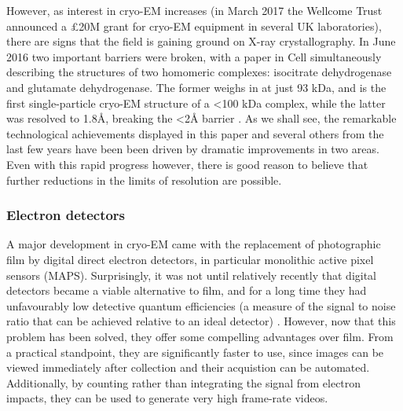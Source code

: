 \documentclass[a4paper,11pt,twoside,openright]{scrbook}
\let\cite\supercite
\begin{document}
However, as interest in cryo-EM increases (in March 2017 the Wellcome Trust announced a £20M grant for cryo-EM equipment in several UK laboratories), there are signs that the field is gaining ground on X-ray crystallography. In June 2016 two important barriers were broken, with a paper in Cell simultaneously describing the structures of two homomeric complexes: isocitrate dehydrogenase and glutamate dehydrogenase. The former weighs in at just 93 kDa, and is the first single-particle cryo-EM structure of a <100 kDa complex, while the latter was resolved to 1.8Å, breaking the <2Å barrier \cite{Merk2016}. As we shall see, the remarkable technological achievements displayed in this paper and several others from the last few years have been been driven by dramatic improvements in two areas\cite{Bai2015}. Even with this rapid progress however, there is good reason to believe that further reductions in the limits of resolution are possible.




\subsubsection{Electron detectors}
A major development in cryo-EM came with the replacement of photographic film by digital direct electron detectors, in particular monolithic active pixel sensors (MAPS). Surprisingly, it was not until relatively recently that digital detectors became a viable alternative to film, and for a long time they had unfavourably low detective quantum efficiencies (a measure of the signal to noise ratio that can be achieved relative to an ideal detector) \cite{McMullan2009}. However, now that this problem has been solved, they offer some compelling advantages over film. From a practical standpoint, they are significantly faster to use, since images can be viewed immediately after collection and their acquistion can be automated. Additionally, by counting rather than integrating the signal from electron impacts, they can be used to generate very high frame-rate videos.
\end{document}
